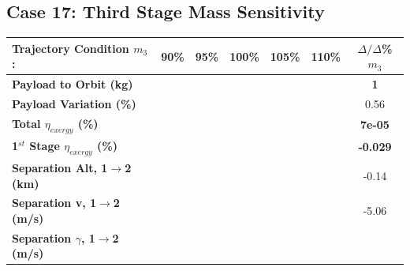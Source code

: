 \subsection{Case 17: Third Stage Mass Sensitivity}

\begin{table}[ht]
	\centering
	\begin{tabular}{l c c c c c c} 
		\hline \textbf{Trajectory Condition}   \qquad  $m_{3}$:
		&90\%
		&95\%
		&100\%
		&105\%
		&110\%
		& $\Delta/\Delta$\%$m_{3}$
		\\
		\hline \textbf{Payload to Orbit (kg)}
		& \textbf{\PayloadToOrbitmThreeNinety}
		& \textbf{\PayloadToOrbitmThreeNinetyFive}
		& \textbf{\PayloadToOrbitmThreeStandard}
		& \textbf{\PayloadToOrbitmThreeOneHundredFive}
		& \textbf{\PayloadToOrbitmThreeOneHundredTen}
		&\textbf{1}
		\\
		\textbf{Payload Variation (\%)}
		& \PayloadVarmThreeNinety
		& \PayloadVarmThreeNinetyFive
		& \PayloadVarmThreeStandard
		& \PayloadVarmThreeOneHundredFive
		& \PayloadVarmThreeOneHundredTen
		&0.56
		\\
		\textbf{Total $\eta_{exergy}$ (\%)}
		& \textbf{\totalExergyEffmThreeNinety}
		& \textbf{\totalExergyEffmThreeNinetyFive}
		& \textbf{\totalExergyEffmThreeStandard}
		& \textbf{\totalExergyEffmThreeOneHundredFive}
		& \textbf{\totalExergyEffmThreeOneHundredTen}
		& \textbf{7e-05}
		\\
		\hline 
		\textbf{1$^{st}$ Stage $\eta_{exergy}$ (\%)}
		& \textbf{\firstExergyEffmThreeNinety}
		& \textbf{\firstExergyEffmThreeNinetyFive}
		& \textbf{\firstExergyEffmThreeStandard}
		& \textbf{\firstExergyEffmThreeOneHundredFive}
		& \textbf{\firstExergyEffmThreeOneHundredTen}
		& \textbf{-0.029}
		\\
		\textbf{Separation Alt, 1$\rightarrow$2 (km)}
		& \firstsecondSeparationAltmThreeNinety
		& \firstsecondSeparationAltmThreeNinetyFive
		& \firstsecondSeparationAltmThreeStandard
		& \firstsecondSeparationAltmThreeOneHundredFive
		& \firstsecondSeparationAltmThreeOneHundredTen
		&-0.14
		\\
		\textbf{Separation v, 1$\rightarrow$2 (m/s)}
		& \firstsecondSeparationvmThreeNinety
		& \firstsecondSeparationvmThreeNinetyFive
		& \firstsecondSeparationvmThreeStandard
		& \firstsecondSeparationvmThreeOneHundredFive
		& \firstsecondSeparationvmThreeOneHundredTen
		&-5.06
		\\
		\textbf{Separation $\gamma$, 1$\rightarrow$2 (m/s)}
		& \firstsecondSeparationgammamThreeNinety
		& \firstsecondSeparationgammamThreeNinetyFive

\end{tabular}
\end{table}
